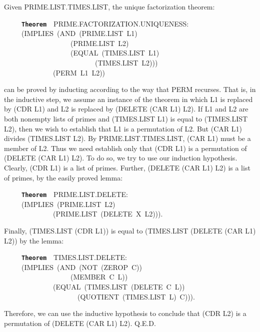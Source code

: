 \documentclass[11pt]{book}
\newenvironment{pubasis}{\begin{flushleft}\ttfamily\small}{\normalsize\rmfamily\end{flushleft}}
\newcommand{\axiomordefinition}[1]{\vspace{6pt}\texttt{\textbf{#1}}}
\begin{document}
Given PRIME.LIST.TIMES.LIST, the unique factorization theorem:
\begin{pubasis}
~~~~~\axiomordefinition{Theorem}~~PRIME.FAC\-TOR\-I\-ZA\-TION.UNIQUENESS:\\
~~~~~(IMPLIES~(AND~(PRIME.LIST~L1)\\
~~~~~~~~~~~~~~~~~~~(PRIME.LIST~L2)\\
~~~~~~~~~~~~~~~~~~~(EQUAL~(TIMES.LIST~L1)\\
~~~~~~~~~~~~~~~~~~~~~~~~~~(TIMES.LIST~L2)))\\
~~~~~~~~~~~~~~(PERM~L1~L2))\\
\end{pubasis}
can be
proved  by inducting according to the way that PERM
recurses.  That is, in the inductive step, we  assume
an instance of the  theorem in which L1 is replaced
by (CDR L1) and L2 is replaced by (DELETE (CAR L1) L2).
If L1 and L2 are both nonempty lists of primes and
(TIMES.LIST L1) is equal to (TIMES.LIST L2), then we
wish to establish that L1 is a permutation of L2.
But (CAR L1)
divides (TIMES.LIST L2).  By PRIME.LIST.TIMES.LIST, (CAR L1)
must be a member of L2. Thus we  need  establish only
that (CDR L1) is a permutation of (DELETE (CAR L1) L2).  To do so, we
try to use our induction hypothesis.  Clearly, (CDR L1) is a list
of primes.  Further,
(DELETE (CAR L1) L2) is a list of primes, by the easily proved lemma:
\begin{pubasis}
~~~~~\axiomordefinition{Theorem}~~PRIME.LIST.DELETE:\\
~~~~~(IMPLIES~(PRIME.LIST~L2)\\
~~~~~~~~~~~~~~(PRIME.LIST~(DELETE~X~L2))).\\
\end{pubasis}
Finally, (TIMES.LIST (CDR L1)) is equal to
(TIMES.LIST (DELETE (CAR L1) L2)) by the lemma:
\begin{pubasis}
~~~~~\axiomordefinition{Theorem}~~TIMES.LIST.DELETE:\\
~~~~~(IMPLIES~(AND~(NOT~(ZEROP~C))\\
~~~~~~~~~~~~~~~~~~~(MEMBER~C~L))\\
~~~~~~~~~~~~~~(EQUAL~(TIMES.LIST~(DELETE~C~L))\\
~~~~~~~~~~~~~~~~~~~~~(QUOTIENT~(TIMES.LIST~L)~C))).\\
\end{pubasis}
Therefore, we can use the inductive hypothesis to
conclude that (CDR L2) is a permutation of (DELETE (CAR L1) L2).
Q.E.D.
\end{document}
